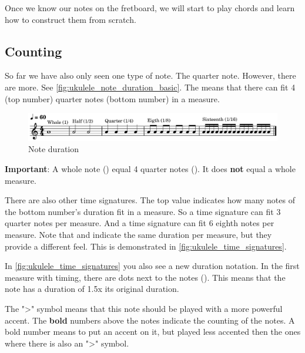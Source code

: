 Once we know our notes on the fretboard, we will start to play chords and learn how to construct them from scratch.

\newpage

\subsection{Counting}

So far we have also only seen one type of note. The quarter note. However, there are more. See \autoref{fig:ukulele_note_duration_basic}. The  means that there can fit 4 (top number) quarter notes (bottom number) in a measure. 

\begin{figure}[h]
	\centering
	\includegraphics[width=\textwidth]{../../MuseScore/Ukulele/MusicNotation/NoteDurations_Basic.png}
	\caption{Note duration}
	\label{fig:ukulele_note_duration_basic}
\end{figure}

\textbf{Important}: A whole note (\wholeNote) equal 4 quarter notes (\quarterNote). It does \textbf{not} equal a whole measure. \newline

There are also other time signatures. The top value indicates how many notes of the bottom number's duration fit in a measure. So a  time signature can fit 3 quarter notes per measure. And a  time signature can fit 6 eighth notes per measure. Note that  and  indicate the same duration per measure, but they provide a different feel. This is demonstrated in \autoref{fig:ukulele_time_signatures}.

In \autoref{fig:ukulele_time_signatures} you also see a new duration notation. In the first measure with  timing, there are dots next to the notes (\quarterNoteDottedDown). This means that the note has a duration of 1.5x its original duration.

The ">" symbol means that this note should be played with a more powerful accent. The \textbf{bold} numbers above the notes indicate the counting of the notes. A bold number means to put an accent on it, but played less accented then the ones where there is also an ">" symbol.

